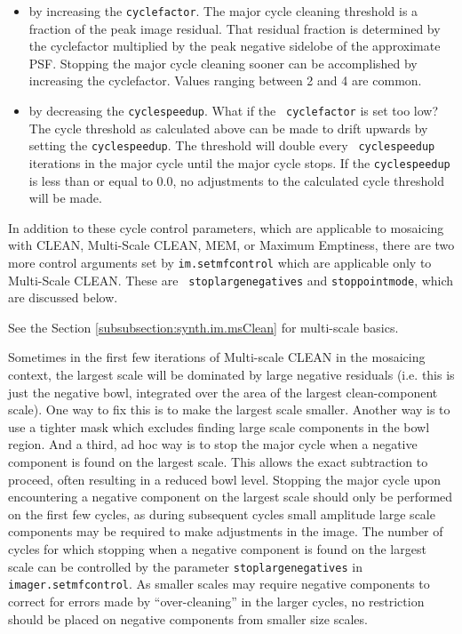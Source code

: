 \begin{itemize}
  \item by increasing the {\tt cyclefactor}.  The major cycle cleaning
        threshold is a fraction of the peak image residual.  That
        residual fraction is determined by the cyclefactor multiplied
        by the peak negative sidelobe of the approximate PSF.
        Stopping the major cycle cleaning sooner can be accomplished
        by increasing the cyclefactor.  Values ranging between 2 and 4
        are common.

   \item by decreasing the {\tt cyclespeedup}. What if the {\tt
         cyclefactor} is set too low? The cycle threshold as
         calculated above can be made to drift upwards by setting the
         {\tt cyclespeedup}.  The threshold will double every {\tt
         cyclespeedup} iterations in the major cycle until the major
         cycle stops.  If the {\tt cyclespeedup} is less than or equal
         to 0.0, no adjustments to the calculated cycle threshold will
         be made.
\end{itemize}

In addition to these cycle control parameters, which are applicable to
mosaicing with CLEAN, Multi-Scale CLEAN, MEM, or Maximum Emptiness,
there are two more control arguments set by {\tt im.setmfcontrol}
which are applicable only to Multi-Scale CLEAN.  These are {\tt
stoplargenegatives} and {\tt stoppointmode}, which are discussed
below.

\vspace{3mm}

See the Section \ref{subsubsection:synth.im.msClean} for multi-scale
basics. 

Sometimes in the first few iterations of Multi-scale CLEAN in the
mosaicing context, the largest scale will be dominated by large
negative residuals (i.e. this is just the negative bowl, integrated
over the area of the largest clean-component scale).  One way to fix
this is to make the largest scale smaller.  Another way is to use a
tighter mask which excludes finding large scale components in the bowl
region.  And a third, ad hoc way is to stop the major cycle when a
negative component is found on the largest scale.  This allows the
exact subtraction to proceed, often resulting in a reduced bowl level.
Stopping the major cycle upon encountering a negative component on the
largest scale should only be performed on the first few cycles, as
during subsequent cycles small amplitude large scale components may be
required to make adjustments in the image.  The number of cycles for
which stopping when a negative component is found on the largest scale
can be controlled by the parameter {\tt stoplargenegatives} in {\tt
imager.setmfcontrol}.  As smaller scales may require negative
components to correct for errors made by ``over-cleaning'' in the
larger cycles, no restriction should be placed on negative components
from smaller size scales.

